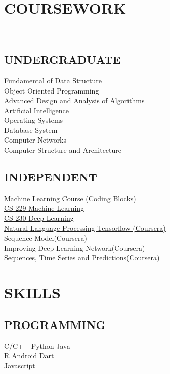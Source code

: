 \documentclass[]{deedy-resume-openfont}
\begin{document}
\begin{minipage}[t]{0.33\textwidth}

\section{COURSEWORK}
\quad \\
\subsection{UNDERGRADUATE}

Fundamental of Data Structure \\
Object Oriented Programming \\ 
Advanced Design and Analysis of Algorithms \\ 
Artificial Intelligence \\ 
Operating Systems \\ 
Database System \\ 
Computer Networks \\ 
Computer Structure and Architecture \\ 

\sectionsep

\subsection{INDEPENDENT}

\href{https://online.codingblocks.com/app/certificates/CBOL-26635-2848}{Machine Learning Course (Coding Blocks)} \\
\href{http://cs229.stanford.edu/}{CS 229 Machine Learning} \\
\href{https://cs230.stanford.edu/}{CS 230 Deep Learning} \\
\href{https://coursera.org/share/0d85004d7396f79556aa1a92de8a3ab5}{Natural Language Processing Tensorflow (Coursera)} \\
Sequence Model(Coursera) \\
Improving Deep Learning Network(Coursera) \\
Sequences, Time Series and Predictions(Coursera) \\



\section{SKILLS}
\subsection{PROGRAMMING}
\textbullet{}   C/C++ \textbullet{}   Python \textbullet{} Java \\
\textbullet{} R \textbullet{} Android \textbullet{} Dart \\ 
\textbullet{} Javascript 
\sectionsep

\end{minipage}
\end{document}
